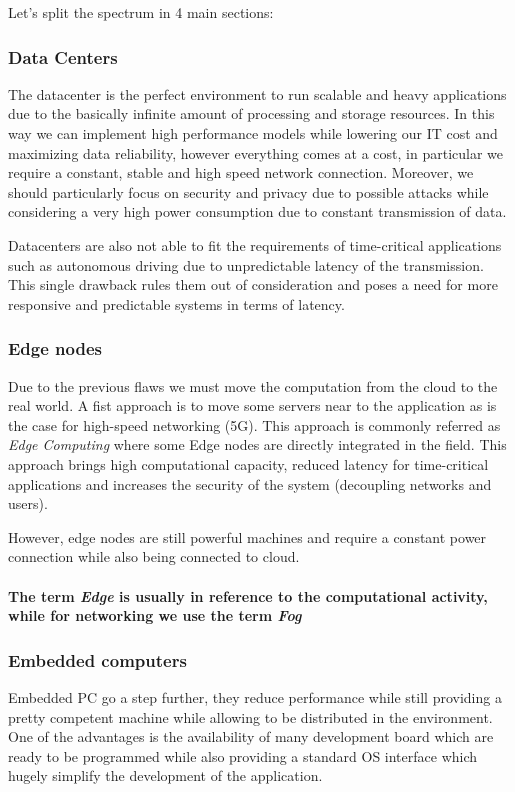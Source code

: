 \documentclass{article}
\begin{document}
      Let's split the spectrum in 4 main sections:

      \subsubsection{Data Centers}
      The datacenter is the perfect environment to run scalable and heavy applications due to the basically infinite amount of processing and storage resources. In this way we can implement
      high performance models while lowering our IT cost and maximizing data reliability, however everything comes at a cost, in particular we require a constant, stable and high speed network connection.
      Moreover, we should particularly focus on security and privacy due to possible attacks while considering a very high power consumption due to constant transmission of data.

      Datacenters are also not able to fit the requirements of time-critical applications such as autonomous driving due to unpredictable latency of the transmission. This single drawback rules them out
      of consideration and poses a need for more responsive and predictable systems in terms of latency.

      \subsubsection{Edge nodes}
      Due to the previous flaws we must move the computation from the cloud to the real world. A fist approach is to move some servers near to the application as is the case for high-speed networking (5G).
      This approach is commonly referred as \emph{Edge Computing} where some Edge nodes are directly integrated in the field. This approach brings high computational capacity, reduced latency for time-critical
      applications and increases the security of the system (decoupling networks and users).

      However, edge nodes are still powerful machines and require a constant power connection while also being connected to cloud.

      \paragraph{The term \emph{Edge} is usually in reference to the computational activity, while for networking we use the term \emph{Fog}}

      \subsubsection{Embedded computers}
      Embedded PC go a step further, they reduce performance while still providing a pretty competent machine while allowing to be distributed in the environment. One of the advantages is the availability of many
      development board which are ready to be programmed while also providing a standard OS interface which hugely simplify the development of the application.
\end{document}
